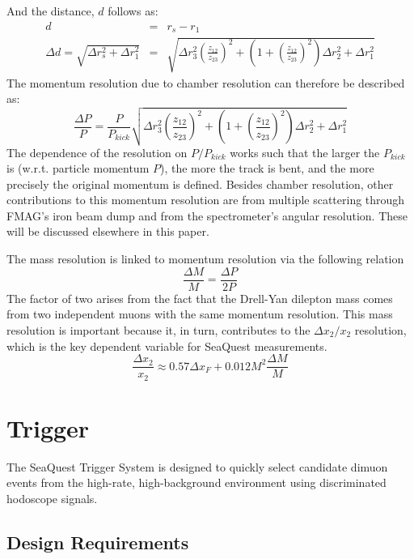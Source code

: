And the distance, $d$ follows as:
\begin{eqnarray}
d & = & r_s - r_1 \\
\Delta d = \sqrt{\Delta r_s^2 + \Delta r_1^2} & = & \sqrt{ \Delta r_3^2 \left(\frac{z_{12}}{z_{23}}\right)^2 + (1 + \left( \frac{z_{12}}{z_{23}} \right)^2) \Delta r_2^2 + \Delta r_1^2}
\end{eqnarray}
The momentum resolution due to chamber resolution can therefore be described as:
\begin{equation}
\frac{\Delta P}{P} = \frac{P}{P_{kick}} \sqrt{ \Delta r_3^2 \left(\frac{z_{12}}{z_{23}}\right)^2 + \left(1 + \left( \frac{z_{12}}{z_{23}} \right)^2 \right) \Delta r_2^2 + \Delta r_1^2}
\end{equation}
The dependence of the resolution on $P/P_{kick}$ works such that the larger the $P_{kick}$ is (w.r.t. particle momentum $P$), the more the track is bent, and the more precisely the original momentum is defined. Besides chamber resolution, other contributions to this momentum resolution are from multiple scattering through FMAG's iron beam dump and from the spectrometer's angular resolution. These will be discussed elsewhere in this paper.

The mass resolution is linked to momentum resolution via the following relation
\begin{equation}
\frac{\Delta M}{M} = \frac{\Delta P}{2 P}
\end{equation}
The factor of two arises from the fact that the Drell-Yan dilepton mass comes from two independent muons with the same momentum resolution. This mass resolution is important because it, in turn, contributes to the $\Delta x_2 / x_2$ resolution, which is the key dependent variable for SeaQuest measurements.
\begin{equation}
\frac{\Delta x_2}{x_2} \approx 0.57 \Delta x_F + 0.012 M^2 \frac{\Delta M}{M}
\end{equation}

\section{Trigger}

The SeaQuest Trigger System is designed to quickly select candidate dimuon events from the high-rate, high-background environment using discriminated hodoscope signals.

\subsection{Design Requirements}

